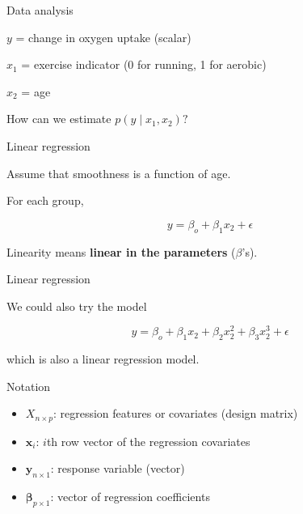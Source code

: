 \documentclass[
  ignorenonframetext,
]{beamer}
\providecommand{\tightlist}{%
  \setlength{\itemsep}{0pt}\setlength{\parskip}{0pt}}
\newcommand{\bx}   {\bm{x}}
\newcommand{\by}   {\bm{y}}
\newcommand{\bbeta}{\bm{\beta}}
\begin{document}
\begin{frame}{Data analysis}
\protect\hypertarget{data-analysis}{}

\(y\) = change in oxygen uptake (scalar)

\(x_1\) = exercise indicator (0 for running, 1 for aerobic)

\(x_2\) = age

How can we estimate \(p(y \mid x_1, x_2)?\)

\end{frame}

\begin{frame}{Linear regression}
\protect\hypertarget{linear-regression}{}

Assume that smoothness is a function of age.

For each group,

\[y = \beta_o + \beta_1 x_2 + \epsilon\]

Linearity means \textbf{linear in the parameters} (\(\beta\)'s).

\end{frame}

\begin{frame}{Linear regression}
\protect\hypertarget{linear-regression-1}{}

We could also try the model

\[y = \beta_o + \beta_1 x_2 +  \beta_2 x_2^2 + \beta_3 x_2^3 + \epsilon\]

which is also a linear regression model.

\end{frame}

\begin{frame}{Notation}
\protect\hypertarget{notation}{}

\begin{itemize}
\tightlist
\item
  \(X_{n\times p}\): regression features or covariates (design matrix)
\item
  \(\bx_i\): \(i\)th row vector of the regression covariates
\item
  \(\by_{n\times 1}\): response variable (vector)
\item
  \(\bbeta_{p \times 1}\): vector of regression coefficients
\end{itemize}

\end{frame}
\end{document}
